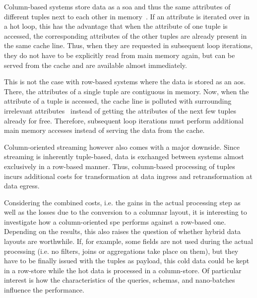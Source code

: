 Column-based systems store data as a \ac{soa} and thus the same attributes of different tuples next to each other in memory~\cite{DBLP:conf/sigmod/AbadiMH08,DBLP:conf/vldb/AilamakiDHS01}.
If an attribute is iterated over in a hot loop, this has the advantage that when the attribute of one tuple is accessed, the corresponding attributes of the other tuples are already present in the same cache line.
Thus, when they are requested in subsequent loop iterations, they do not have to be explicitly read from main memory again, but can be served from the cache and are available almost immediately.

This is not the case with row-based systems where the data is stored as an \ac{aos}.
There, the attributes of a single tuple are contiguous in memory.
Now, when the attribute of a tuple is accessed, the cache line is polluted with surrounding irrelevant attributes~\cite{DBLP:conf/sigmod/AbadiMH08,DBLP:conf/vldb/AilamakiDHS01} instead of getting the attributes of the next few tuples already for free.
Therefore, subsequent loop iterations must perform additional main memory accesses instead of serving the data from the cache.

Column-oriented streaming however also comes with a major downside.
Since streaming is inherently tuple-based, data is exchanged between systems almost exclusively in a row-based manner.
Thus, column-based processing of tuples incurs additional costs for transformation at data ingress and retransformation at data egress.

Considering the combined costs, i.e. the gains in the actual processing step as well as the losses due to the conversion to a columnar layout, it is interesting to investigate how a column-oriented \ac{spe} performs against a row-based one.
Depending on the results, this also raises the question of whether hybrid data layouts are worthwhile.
If, for example, some fields are not used during the actual processing (i.e. no filters, joins or aggregations take place on them), but they have to be finally issued with the tuples as payload, this cold data could be kept in a row-store while the hot data is processed in a column-store.
Of particular interest is how the characteristics of the queries, schemas, and nano-batches influence the performance.
